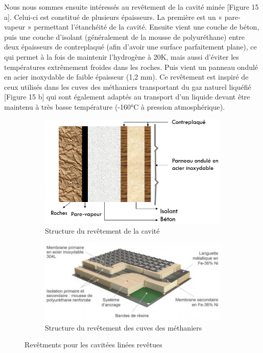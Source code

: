 \documentclass[11pt,french,a4paper]{article}
\begin{document}
Nous nous sommes ensuite intéressés au revêtement de la cavité minée [Figure 15 a]. Celui-ci est constitué de plusieurs épaisseurs. La première est un « pare-vapeur » permettant l’étanchéité de la cavité. Ensuite vient une couche de béton, puis une couche d’isolant (généralement de la mousse de polyuréthane) entre deux épaisseurs de contreplaqué (afin d’avoir une surface parfaitement plane), ce qui permet à la fois de maintenir l’hydrogène à 20K, mais aussi d’éviter les températures extrêmement froides dans les roches. Puis vient un panneau ondulé en acier inoxydable de faible épaisseur (1,2 mm).
Ce revêtement est inspiré de ceux utilisés dans les cuves des méthaniers transportant du gaz naturel liquéfié [Figure 15 b] qui sont également adaptés au transport d’un liquide devant être maintenu à très basse température (-160°C à pression atmosphérique).\\

\begin{figure}[h!]
\centering
\begin{subfigure}[b]{0.4\linewidth}
\includegraphics[width=\linewidth]{image/chap2/Figure 3.ii.2-3.png}
\caption{Structure du revêtement de la cavité}
\end{subfigure}
\begin{subfigure}[b]{0.4\linewidth}
\includegraphics[width=\linewidth]{image/chap2/Figure 3.ii.2-4.png}
\caption{Structure du revêtement des cuves des méthaniers}
\end{subfigure}
\caption{Revêtments pour les cavitées linées revêtues}
\end{figure}
\end{document}
